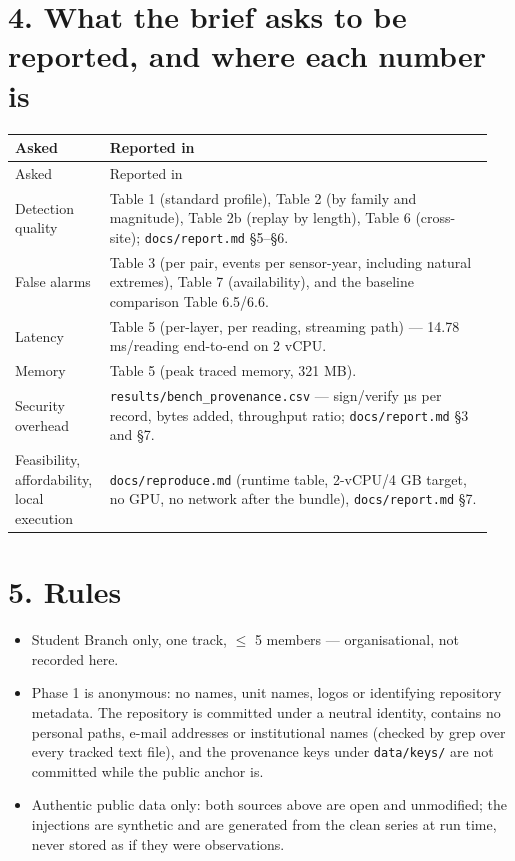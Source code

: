 \documentclass[10pt,a4paper]{article}
\begin{document}
\section*{4. What the brief asks to be reported, and where each number is}
{\small
\setlength{\tabcolsep}{4.5pt}
\setlength{\LTleft}{\fill}
\setlength{\LTright}{\fill}
\begin{longtable}{>{\raggedright\arraybackslash}p{0.180\linewidth}>{\raggedright\arraybackslash}p{0.773\linewidth}}
\toprule
Asked & Reported in \\
\midrule
\endfirsthead
\toprule
Asked & Reported in \\
\midrule
\endhead
\bottomrule
\endlastfoot
Detection quality & Table 1 (standard profile), Table 2 (by family and magnitude), Table 2b (replay by length), Table 6 (cross-\allowbreak{}site); \texttt{docs/\allowbreak{}report.md} §5–§6. \\
False alarms & Table 3 (per pair, events per sensor-\allowbreak{}year, including natural extremes), Table 7 (availability), and the baseline comparison Table 6.5/\allowbreak{}6.6. \\
Latency & Table 5 (per-\allowbreak{}layer, per reading, streaming path) — 14.78 ms/\allowbreak{}reading end-\allowbreak{}to-\allowbreak{}end on 2 vCPU. \\
Memory & Table 5 (peak traced memory, 321 MB). \\
Security overhead & \texttt{results/\allowbreak{}bench\_\allowbreak{}provenance.csv} — sign/\allowbreak{}verify µs per record, bytes added, throughput ratio; \texttt{docs/\allowbreak{}report.md} §3 and §7. \\
Feasibility, affordability, local execution & \texttt{docs/\allowbreak{}reproduce.md} (runtime table, 2-\allowbreak{}vCPU/\allowbreak{}4 GB target, no GPU, no network after the bundle), \texttt{docs/\allowbreak{}report.md} §7. \\
\end{longtable}
}

\section*{5. Rules}
\begin{itemize}
\item Student Branch only, one track, $\leq$ 5 members — organisational, not recorded here.
\item Phase 1 is anonymous: no names, unit names, logos or identifying repository
metadata. The repository is committed under a neutral identity, contains no personal paths, e-\allowbreak{}mail addresses or institutional names (checked by grep over every tracked text file), and the provenance keys under \texttt{data/\allowbreak{}keys/\allowbreak{}} are not committed while the public anchor is.

\item Authentic public data only: both sources above are open and unmodified; the
injections are synthetic and are generated from the clean series at run time, never stored as if they were observations.

\end{itemize}
\end{document}
